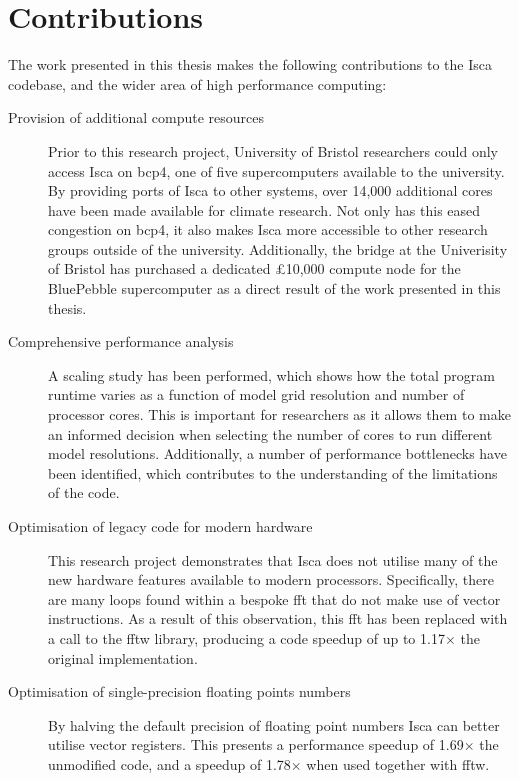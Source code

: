 \documentclass[a4paper,11pt]{report}
\begin{document}
\section{Contributions}
The work presented in this thesis makes the following contributions to the Isca codebase, and the wider area of high performance computing:
\begin{description}
	\item[Provision of additional compute resources] Prior to this research project, University of Bristol researchers could only access Isca on \gls{bcp4}, one of five supercomputers available to the university. By providing ports of Isca to other systems, over 14,000 additional cores have been made available for climate research. Not only has this eased congestion on \gls{bcp4}, it also makes Isca more accessible to other research groups outside of the university. Additionally, the \gls{bridge} at the Univerisity of Bristol has purchased a dedicated £10,000 compute node for the BluePebble supercomputer as a direct result of the work presented in this thesis. 

	\item[Comprehensive performance analysis] A scaling study has been performed, which shows how the total program runtime varies as a function of model grid resolution and number of processor cores. This is important for researchers as it allows them to make an informed decision when selecting the number of cores to run different model resolutions. Additionally, a number of performance bottlenecks have been identified, which contributes to the understanding of the limitations of the code. 
	
	\item[Optimisation of legacy code for modern hardware] This research project demonstrates that Isca does not utilise many of the new hardware features available to modern processors. Specifically, there are many loops found within a bespoke \gls{fft} that do not make use of vector instructions. As a result of this observation, this \gls{fft} has been replaced with a call to the \gls{fftw} library, producing a code speedup of up to 1.17$\times$ the original implementation.
	
	\item[Optimisation of single-precision floating points numbers] By halving the default precision of floating point numbers Isca can better utilise vector registers. This presents a performance speedup of 1.69$\times$ the unmodified code, and a speedup of 1.78$\times$ when used together with \gls{fftw}. 
	

\end{description}
\end{document}
